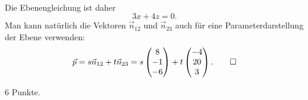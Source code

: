 \begin{loesung}
\begin{align*}
\end{align*}
Die Ebenengleichung ist daher
\[
3x+4z=0.
\]
Man kann natürlich die Vektoren ${\vec n}_{12}$ und ${\vec n}_{23}$
auch für eine Parameterdarstellung der Ebene verwenden:
\[
\vec p
=
s {\vec n}_{12} + t {\vec n}_{23}
=
s\begin{pmatrix} 8\\-1\\-6 \end{pmatrix}
+
t\begin{pmatrix} -4\\20\\3 \end{pmatrix}.
\qedhere
\]
\end{loesung}

\begin{bewertung}
6 Punkte.
\end{bewertung}

